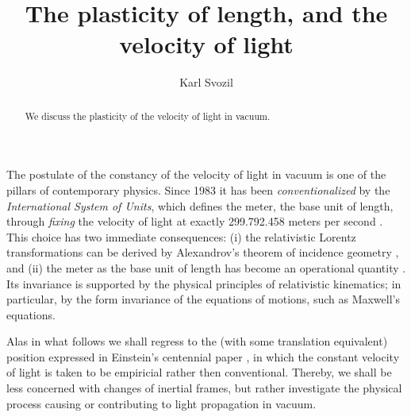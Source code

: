 \documentclass[%
 reprint,
 showpacs,
 showkeys,
 preprintnumbers,
 amsmath,amssymb,
 aps,
 prl,
  longbibliography,
 ]{revtex4-1}
\theoremstyle{definition}
\theoremstyle{remark}
\begin{document}
\title{The plasticity of length, and the velocity of light}


\author{Karl Svozil}

 



\begin{abstract}
We discuss the plasticity of the velocity of light in vacuum.
\end{abstract}

\maketitle

The postulate of the constancy of the velocity of light in vacuum is one of the pillars of contemporary physics.
Since 1983 it has been {\em conventionalized}
by the {\em International System of Units}, which defines the meter, the base unit of length,
through {\em fixing} the velocity of light at exactly 299.792.458 meters per second
\cite{pet-83,0026-1394-19-4-004}.
This choice has two immediate consequences:
(i)
the relativistic Lorentz transformations
can be derived
by Alexandrov's theorem of incidence geometry \cite{lester},
and
(ii)
the meter as the base unit of length has become an operational quantity
\cite{peres-84,pet-row--84}.
Its invariance is supported by the physical principles of relativistic kinematics;
in particular, by the form invariance of the equations of motions, such as
Maxwell's equations.

Alas in what follows we shall regress to the (with some translation equivalent)
position expressed in Einstein's centennial paper \cite{ein-05},
in which the constant velocity of light is taken to be empiricial rather then conventional.
Thereby, we shall be less concerned with changes of inertial frames,
but rather investigate the physical process causing
or contributing to light propagation in vacuum.
\end{document}
